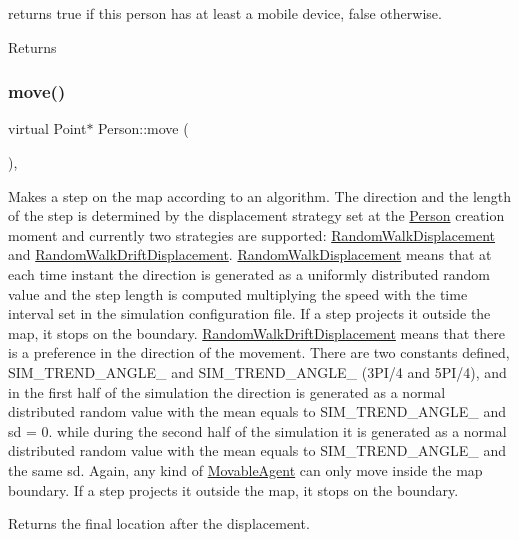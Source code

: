 returns true if this person has at least a mobile device, false otherwise. \begin{DoxyReturn}{Returns}

\end{DoxyReturn}
\mbox{\label{class_person_a922e0462a1e7eac6523a9a864ce27afc}} 
\subsubsection{\texorpdfstring{move()}{move()}}
{\footnotesize\ttfamily virtual Point$\ast$ Person\+::move (\begin{DoxyParamCaption}{ }\end{DoxyParamCaption})\hspace{0.3cm}{\ttfamily [override]}, {\ttfamily [virtual]}}

Makes a step on the map according to an algorithm. The direction and the length of the step is determined by the displacement strategy set at the \hyperlink{class_person}{Person} creation moment and currently two strategies are supported\+: \hyperlink{class_random_walk_displacement}{Random\+Walk\+Displacement} and \hyperlink{class_random_walk_drift_displacement}{Random\+Walk\+Drift\+Displacement}. \hyperlink{class_random_walk_displacement}{Random\+Walk\+Displacement} means that at each time instant the direction is generated as a uniformly distributed random value and the step length is computed multiplying the speed with the time interval set in the simulation configuration file. If a step projects it outside the map, it stops on the boundary. \hyperlink{class_random_walk_drift_displacement}{Random\+Walk\+Drift\+Displacement} means that there is a preference in the direction of the movement. There are two constants defined, S\+I\+M\+\_\+\+T\+R\+E\+N\+D\+\_\+\+A\+N\+G\+L\+E\+\_ and S\+I\+M\+\_\+\+T\+R\+E\+N\+D\+\_\+\+A\+N\+G\+L\+E\+\_ (3\+P\+I/4 and 5\+P\+I/4), and in the first half of the simulation the direction is generated as a normal distributed random value with the mean equals to S\+I\+M\+\_\+\+T\+R\+E\+N\+D\+\_\+\+A\+N\+G\+L\+E\+\_ and sd = 0. while during the second half of the simulation it is generated as a normal distributed random value with the mean equals to S\+I\+M\+\_\+\+T\+R\+E\+N\+D\+\_\+\+A\+N\+G\+L\+E\+\_ and the same sd. Again, any kind of \hyperlink{class_movable_agent}{Movable\+Agent} can only move inside the map boundary. If a step projects it outside the map, it stops on the boundary. \begin{DoxyReturn}{Returns}
the final location after the displacement. 
\end{DoxyReturn}


